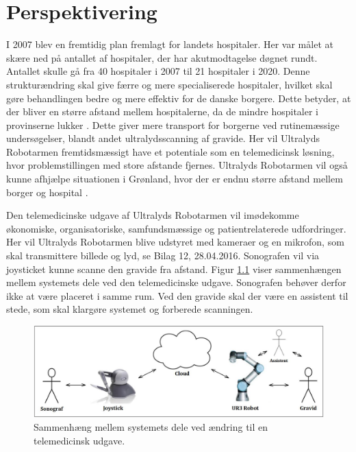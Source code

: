 \chapter{Perspektivering}
I 2007 blev en fremtidig plan fremlagt for landets hospitaler. Her var målet at skære ned på antallet af hospitaler, der har akutmodtagelse døgnet rundt. Antallet skulle gå fra 40 hospitaler i 2007 til 21 hospitaler i 2020. Denne strukturændring skal give færre og mere specialiserede hospitaler, hvilket skal gøre behandlingen bedre og mere effektiv for de danske borgere. Dette betyder, at der bliver en større afstand mellem hospitalerne, da de mindre hospitaler i provinserne lukker \cite{supersygehus}. Dette giver mere transport for borgerne ved rutinemæssige undersøgelser, blandt andet ultralydsscanning af gravide. Her vil Ultralyds Robotarmen fremtidsmæssigt have et potentiale som en telemedicinsk løsning, hvor problemstillingen med store afstande fjernes. Ultralyds Robotarmen vil også kunne afhjælpe situationen i Grønland, hvor der er endnu større afstand mellem borger og hospital \cite{greenland}.

Den telemedicinske udgave af Ultralyds Robotarmen vil imødekomme økonomiske, organisatoriske, samfundsmæssige og patientrelaterede udfordringer. Her vil Ultralyds Robotarmen blive udstyret med kameraer og en mikrofon, som skal transmittere billede og lyd, se Bilag 12, 28.04.2016. Sonografen vil via joysticket kunne scanne den gravide fra afstand. Figur \ref{systemTelemedicin} viser sammenhængen mellem systemets dele ved den telemedicinske udgave. Sonografen behøver derfor ikke at være placeret i samme rum. Ved den gravide skal der være en assistent til stede, som skal klargøre systemet og forberede scanningen.

\begin{figure}[H]\centering
	\includegraphics[width = 1.0\textwidth]{Figurer/teknologiTelemedicin.jpg}
	\caption{Sammenhæng mellem systemets dele ved ændring til en telemedicinsk udgave.}
	\label{systemTelemedicin}
\end{figure}


